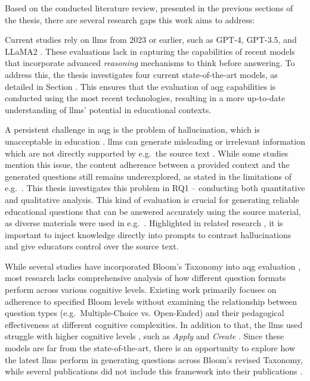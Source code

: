 Based on the conducted literature review, presented in the previous sections of the thesis, there are several research gaps this work aims to address: 

 Current studies rely on \acp{llm} from 2023 or earlier, such as GPT-4, GPT-3.5, and LLaMA2 \cite{scaria_how_2024, maity_can_2025, al_faraby_analysis_2024}. These evaluations lack in capturing the capabilities of recent models that incorporate advanced \textit{reasoning} mechanisms to think before answering. To address this, the thesis investigates four current state-of-the-art models, as detailed in Section . This ensures that the evaluation of \ac{aqg} capabilities is conducted using the most recent technologies, resulting in a more up-to-date understanding of \acp{llm}' potential in educational contexts.

\pagebreak

 A persistent challenge in \ac{aqg} is the problem of hallucination, which is unacceptable in education \cite{yang_heuristic_2024}. \acp{llm} can generate misleading or irrelevant information which are not directly supported by e.g.\ the source text \cite{al_faraby_analysis_2024,duong-trung_bloomllm_2024}. While some studies mention this issue, the content adherence between a provided context and the generated questions still remains underexplored, as stated in the limitations of e.g.\ \cite{doughty_comparative_2024,al_faraby_analysis_2024}. This thesis investigates this problem in RQ1 -- conducting both quantitative and qualitative analysis. This kind of evaluation is crucial for generating reliable educational questions that can be answered accurately using the source material, as diverse materials were used in e.g.\ \cite{scaria_how_2024,maity_can_2025,blobstein_angel_2023}. Highlighted in related research \cite{biancini_multiple-choice_2024}, it is important to inject knowledge directly into prompts to contrast hallucinations and give educators control over the source text.

 While several studies have incorporated Bloom's Taxonomy into \ac{aqg} evaluation \cite{scaria_how_2024, maity_can_2025, blobstein_angel_2023}, most research lacks comprehensive analysis of how different question formats perform across various cognitive levels. Existing work primarily focuses on adherence to specified Bloom levels without examining the relationship between question types (e.g.\ Multiple-Choice vs. Open-Ended) and their pedagogical effectiveness at different cognitive complexities. In addition to that, the \acp{llm} used struggle with higher cognitive levels \cite{blobstein_angel_2023}, such as \textit{Apply} and \textit{Create} \cite{scaria_how_2024}. Since these models are far from the state-of-the-art, there is an opportunity to explore how the latest \acp{llm} perform in generating questions across Bloom's revised Taxonomy, while several publications did not include this framework into their publications \cite{al_faraby_analysis_2024,vu_chatgpt-based_2024,hang_mcqgen_2024}.

